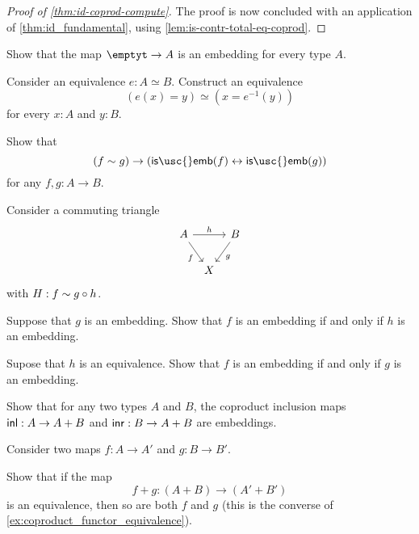 \begin{proof}[Proof of \cref{thm:id-coprod-compute}]
The proof is now concluded with an application of \cref{thm:id_fundamental}, using \cref{lem:is-contr-total-eq-coprod}.
\end{proof}

\begin{exercises}
\item Show that the map $\emptyt\to A$ is an embedding for every type $A$.
\item Consider an equivalence $e:A\simeq B$. Construct an equivalence
  \begin{equation*}
    (e(x)=y)\simeq(x=e^{-1}(y))
  \end{equation*}
  for every $x:A$ and $y:B$.
\item Show that 
\begin{equation*}
(f\htpy g)\to (\mathsf{is\usc{}emb}(f)\leftrightarrow\mathsf{is\usc{}emb}(g))
\end{equation*}
for any $f,g:A\to B$.
\item \label{ex:emb_triangle}Consider a commuting triangle
\begin{equation*}
\begin{tikzcd}[column sep=tiny]
A \arrow[rr,"h"] \arrow[dr,swap,"f"] & & B \arrow[dl,"g"] \\
& X
\end{tikzcd}
\end{equation*}
with $H:f\sim g\circ h$. 
\begin{subexenum}
\item Suppose that $g$ is an embedding. Show that $f$ is an embedding if and only if $h$ is an embedding.
\item Supose that $h$ is an equivalence. Show that $f$ is an embedding if and only if $g$ is an embedding.
\end{subexenum}
\item Show that for any two types $A$ and $B$, the coproduct inclusion maps ${\mathsf{inl}}:A \to A + B$ and ${\mathsf{inr}} : B \to A + B$ are embeddings.
\item \label{ex:is-equiv-is-equiv-functor-coprod}Consider two maps $f:A\to A'$ and $g:B \to B'$.
  \begin{subexenum}
  \item Show that if the map
    \begin{equation*}
      f+g:(A+B)\to (A'+B')
    \end{equation*}
    is an equivalence, then so are both $f$ and $g$ (this is the converse of \cref{ex:coproduct_functor_equivalence}).

\end{subexenum}
\end{exercises}
